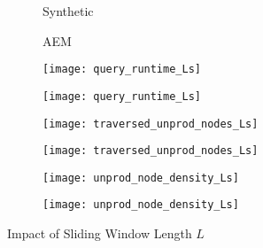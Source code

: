 \documentclass[abstracton,12pt]{scrartcl}
\theoremstyle{definition}
\begin{document}
\begin{figure}[h]
  \centering
  \begin{subfigure}{0.49\linewidth}
    \centering
    Synthetic
  \end{subfigure}
  \begin{subfigure}{0.49\linewidth}
    \centering
    AEM
  \end{subfigure}
  \begin{subfigure}{0.49\linewidth}
    \centering
    \texttt{[image: query\_runtime\_Ls]}
    \caption{}
    \label{fig:query_runtime_Ls_synthetic}
  \end{subfigure}
  \begin{subfigure}{0.49\linewidth}
    \centering
    \texttt{[image: query\_runtime\_Ls]}
    \caption{}
    \label{fig:query_runtime_Ls_aem}
  \end{subfigure}
  \begin{subfigure}{0.49\linewidth}
    \centering
    \texttt{[image: traversed\_unprod\_nodes\_Ls]}
    \caption{}
    \label{fig:trav_unprod_nodes_Ls_synthetic}
  \end{subfigure}
  \begin{subfigure}{0.49\linewidth}
    \centering
    \texttt{[image: traversed\_unprod\_nodes\_Ls]}
    \caption{}
    \label{fig:trav_unprod_nodes_Ls_aem}
  \end{subfigure}
  \begin{subfigure}{0.49\linewidth}
    \centering
    \texttt{[image: unprod\_node\_density\_Ls]}
    \caption{}
    \label{fig:unprod_node_density_Ls_synthetic}
  \end{subfigure}
  \begin{subfigure}{0.49\linewidth}
    \centering
    \texttt{[image: unprod\_node\_density\_Ls]}
    \caption{}
    \label{fig:unprod_node_density_Ls_aem}
  \end{subfigure}
  \caption{Impact of Sliding Window Length $L$}
\end{figure}
\end{document}
